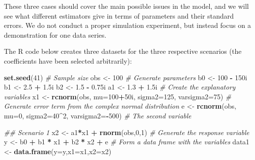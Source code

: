 \documentclass[
]{book}
\newenvironment{Shaded}{\begin{snugshade}}{\end{snugshade}}
\newcommand{\CommentTok}[1]{\textcolor[rgb]{0.56,0.35,0.01}{\textit{#1}}}
\newcommand{\DataTypeTok}[1]{\textcolor[rgb]{0.13,0.29,0.53}{#1}}
\newcommand{\DecValTok}[1]{\textcolor[rgb]{0.00,0.00,0.81}{#1}}
\newcommand{\FloatTok}[1]{\textcolor[rgb]{0.00,0.00,0.81}{#1}}
\newcommand{\KeywordTok}[1]{\textcolor[rgb]{0.13,0.29,0.53}{\textbf{#1}}}
\newcommand{\NormalTok}[1]{#1}
\newcommand{\OperatorTok}[1]{\textcolor[rgb]{0.81,0.36,0.00}{\textbf{#1}}}
\newcommand{\StringTok}[1]{\textcolor[rgb]{0.31,0.60,0.02}{#1}}
\begin{document}
These three cases should cover the main possible issues in the model, and we will see what different estimators give in terms of parameters and their standard errors. We do not conduct a proper simulation experiment, but instead focus on a demonstration for one data series.

The R code below creates three datasets for the three respective scenarios (the coefficients have been selected arbitrarily):

\begin{Shaded}
\begin{Highlighting}[]
\KeywordTok{set.seed}\NormalTok{(}\DecValTok{41}\NormalTok{)}
\CommentTok{\# Sample size}
\NormalTok{obs \textless{}{-}}\StringTok{ }\DecValTok{100}
\CommentTok{\# Generate parameters}
\NormalTok{b0 \textless{}{-}}\StringTok{ }\DecValTok{100} \OperatorTok{{-}}\StringTok{ }\NormalTok{150i}
\NormalTok{b1 \textless{}{-}}\StringTok{ }\FloatTok{2.5} \OperatorTok{+}\StringTok{ }\FloatTok{1.5}\NormalTok{i}
\NormalTok{b2 \textless{}{-}}\StringTok{ }\FloatTok{1.5} \OperatorTok{{-}}\StringTok{ }\FloatTok{0.75}\NormalTok{i}
\NormalTok{a1 \textless{}{-}}\StringTok{ }\FloatTok{1.3} \OperatorTok{+}\StringTok{ }\FloatTok{1.5}\NormalTok{i}
\CommentTok{\# Create the explanatory variables}
\NormalTok{x1 \textless{}{-}}\StringTok{ }\KeywordTok{rcnorm}\NormalTok{(obs, }\DataTypeTok{mu=}\DecValTok{100}\OperatorTok{+}\NormalTok{50i, }\DataTypeTok{sigma2=}\DecValTok{125}\NormalTok{, }\DataTypeTok{varsigma2=}\DecValTok{75}\NormalTok{)}
\CommentTok{\# Generate error term from the complex normal distribution}
\NormalTok{e \textless{}{-}}\StringTok{ }\KeywordTok{rcnorm}\NormalTok{(obs, }\DataTypeTok{mu=}\DecValTok{0}\NormalTok{, }\DataTypeTok{sigma2=}\DecValTok{40}\OperatorTok{\^{}}\DecValTok{2}\NormalTok{, }\DataTypeTok{varsigma2=}\OperatorTok{{-}}\DecValTok{500}\NormalTok{)}
\CommentTok{\# The second variable}

\CommentTok{\#\# Scenario 1}
\NormalTok{x2 \textless{}{-}}\StringTok{ }\NormalTok{a1}\OperatorTok{*}\NormalTok{x1 }\OperatorTok{+}\StringTok{ }\KeywordTok{rnorm}\NormalTok{(obs,}\DecValTok{0}\NormalTok{,}\DecValTok{1}\NormalTok{)}
\CommentTok{\# Generate the response variable}
\NormalTok{y \textless{}{-}}\StringTok{ }\NormalTok{b0 }\OperatorTok{+}\StringTok{ }\NormalTok{b1 }\OperatorTok{*}\StringTok{ }\NormalTok{x1 }\OperatorTok{+}\StringTok{ }\NormalTok{b2 }\OperatorTok{*}\StringTok{ }\NormalTok{x2 }\OperatorTok{+}\StringTok{ }\NormalTok{e}
\CommentTok{\# Form a data frame with the variables}
\NormalTok{data1 \textless{}{-}}\StringTok{ }\KeywordTok{data.frame}\NormalTok{(}\DataTypeTok{y=}\NormalTok{y,}\DataTypeTok{x1=}\NormalTok{x1,}\DataTypeTok{x2=}\NormalTok{x2)}


\end{Highlighting}
\end{Shaded}
\end{document}

